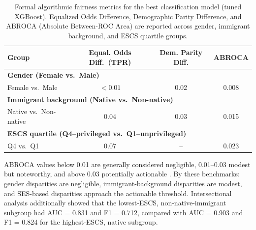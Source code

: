 \begin{table}[htp]
\centering
\caption{Formal algorithmic fairness metrics for the best classification model (tuned XGBoost). Equalized Odds Difference, Demographic Parity Difference, and ABROCA (Absolute Between-ROC Area) are reported across gender, immigrant background, and ESCS quartile groups.}
\label{tab:fairness-metrics}
\begin{tabular}{lccc}
\toprule
Group & Equal. Odds Diff.\ (TPR) & Dem. Parity Diff. & ABROCA \\
\midrule
\multicolumn{4}{l}{\textbf{Gender (Female vs.\ Male)}} \\
Female vs.\ Male & $<0.01$ & 0.02 & 0.008 \\
\midrule
\multicolumn{4}{l}{\textbf{Immigrant background (Native vs.\ Non-native)}} \\
Native vs.\ Non-native & 0.04 & 0.03 & 0.015 \\
\midrule
\multicolumn{4}{l}{\textbf{ESCS quartile (Q4--privileged vs.\ Q1--unprivileged)}} \\
Q4 vs.\ Q1 & 0.07 & -- & 0.023 \\
\bottomrule
\end{tabular}

\par\small\raggedright ABROCA values below 0.01 are generally considered negligible, 0.01--0.03 modest but noteworthy, and above 0.03 potentially actionable \citep{Gandara_2024_blackbox,Verger_2024_MADD}. By these benchmarks: gender disparities are negligible, immigrant-background disparities are modest, and SES-based disparities approach the actionable threshold. Intersectional analysis additionally showed that the lowest-ESCS, non-native-immigrant subgroup had AUC = 0.831 and F1 = 0.712, compared with AUC = 0.903 and F1 = 0.824 for the highest-ESCS, native subgroup.
\end{table}
